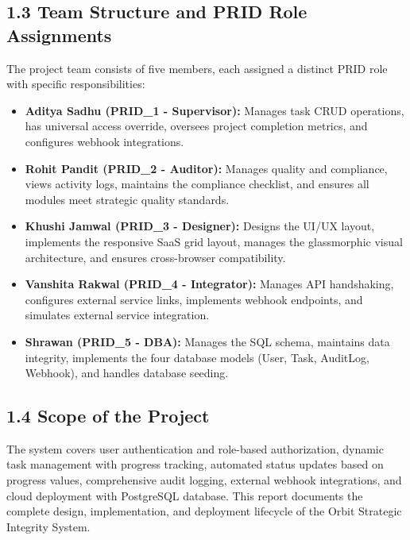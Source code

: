 ﻿\documentclass[12pt]{article}
\begin{document}
\subsection*{1.3 Team Structure and PRID Role Assignments}
The project team consists of five members, each assigned a distinct PRID role with specific responsibilities:
\begin{itemize}
\item \textbf{Aditya Sadhu (PRID\_1 - Supervisor):} Manages task CRUD operations, has universal access override, oversees project completion metrics, and configures webhook integrations.
\item \textbf{Rohit Pandit (PRID\_2 - Auditor):} Manages quality and compliance, views activity logs, maintains the compliance checklist, and ensures all modules meet strategic quality standards.
\item \textbf{Khushi Jamwal (PRID\_3 - Designer):} Designs the UI/UX layout, implements the responsive SaaS grid layout, manages the glassmorphic visual architecture, and ensures cross-browser compatibility.
\item \textbf{Vanshita Rakwal (PRID\_4 - Integrator):} Manages API handshaking, configures external service links, implements webhook endpoints, and simulates external service integration.
\item \textbf{Shrawan (PRID\_5 - DBA):} Manages the SQL schema, maintains data integrity, implements the four database models (User, Task, AuditLog, Webhook), and handles database seeding.
\end{itemize}

\subsection*{1.4 Scope of the Project}
The system covers user authentication and role-based authorization, dynamic task management with progress tracking, automated status updates based on progress values, comprehensive audit logging, external webhook integrations, and cloud deployment with PostgreSQL database. This report documents the complete design, implementation, and deployment lifecycle of the Orbit Strategic Integrity System.
\end{document}
